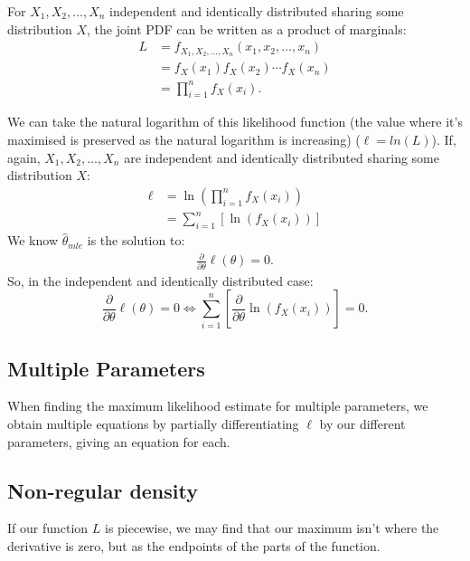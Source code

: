 \documentclass[a4paper, 12pt, twoside]{article}
\begin{document}
For $X_1, X_2, \ldots, X_n$ independent and identically distributed
sharing some distribution $X$, the joint PDF can be written as a
product of marginals:
\begin{align*}
    L & = f_{X_1, X_2, \ldots, X_n}(x_1, x_2, \ldots, x_n) \\
      & = f_X(x_1)f_X(x_2)\cdots f_X(x_n)                  \\
      & = \prod_{i = 1}^n f_X(x_i).
\end{align*}

We can take the natural logarithm of this likelihood function (the value
where it's maximised is preserved as the natural logarithm is increasing)
($\ell = ln(L)$). If, again, $X_1, X_2, \ldots, X_n$ are independent
and identically distributed sharing some distribution $X$:
\begin{align*}
    \ell & = \ln{\left(\prod_{i = 1}^n f_X(x_i)\right)} \\
         & = \sum_{i = 1}^n\left[\ln{(f_X(x_i))}\right]
\end{align*}
We know $\hat\theta_{mle}$ is the solution to:
\begin{align*}
    \frac{\partial}{\partial\theta}\ell(\theta) = 0.
\end{align*}
So, in the independent and identically distributed case:
\begin{equation*}
    \frac{\partial}{\partial\theta}\ell(\theta) = 0
    \Longleftrightarrow
    \sum_{i = 1}^n\left[\frac{\partial}{\partial\theta}\ln{(f_X(x_i))}\right]
    = 0.
\end{equation*}

\subsection{Multiple Parameters}

When finding the maximum likelihood estimate for multiple parameters, we
obtain multiple equations by partially differentiating $\ell$ by our
different parameters, giving an equation for each.

\subsection{Non-regular density}

If our function $L$ is piecewise, we may find that our maximum isn't where
the derivative is zero, but as the endpoints of the parts of the function.

\vspace{\baselineskip}
\end{document}
